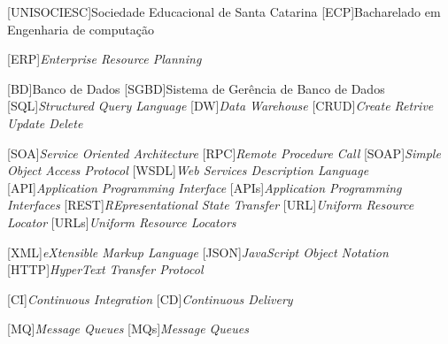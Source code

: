 
[UNISOCIESC]{Sociedade Educacional de Santa Catarina}
[ECP]{Bacharelado em Engenharia de computação}

[ERP]{\emph{Enterprise Resource Planning}}

[BD]{Banco de Dados}
[SGBD]{Sistema de Gerência de Banco de Dados}
[SQL]{\emph{Structured Query Language}}
[DW]{\emph{Data Warehouse}}
[CRUD]{\emph{Create Retrive Update Delete}}

[SOA]{\emph{Service Oriented Architecture}}
[RPC]{\emph{Remote Procedure Call}}
[SOAP]{\emph{Simple Object Access Protocol}}
[WSDL]{\emph{Web Services Description Language}}
[API]{\emph{Application Programming Interface}}
[APIs]{\emph{Application Programming Interfaces}}
[REST]{\emph{REpresentational State Transfer}}
[URL]{\emph{Uniform Resource Locator}}
[URLs]{\emph{Uniform Resource Locators}}

[XML]{\emph{eXtensible Markup Language}}
[JSON]{\emph{JavaScript Object Notation}}
[HTTP]{\emph{HyperText Transfer Protocol}}

[CI]{\emph{Continuous Integration}}
[CD]{\emph{Continuous Delivery}}

[MQ]{\emph{Message Queues}}
[MQs]{\emph{Message Queues}}
